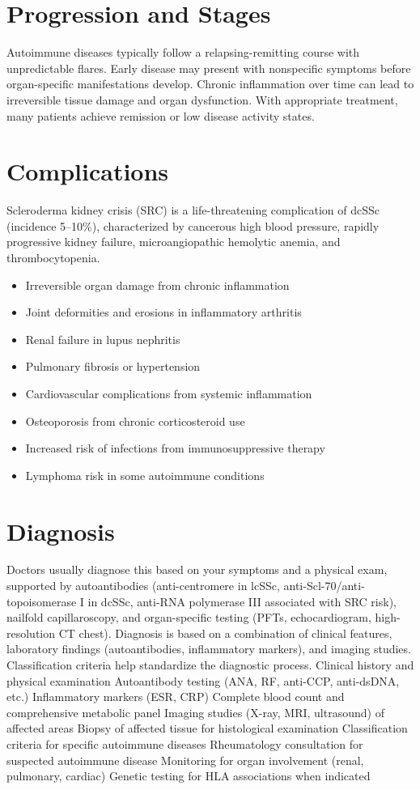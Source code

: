 \section{Progression and Stages}
Autoimmune diseases typically follow a relapsing-remitting course with unpredictable flares. Early disease may present with nonspecific symptoms before organ-specific manifestations develop. Chronic inflammation over time can lead to irreversible tissue damage and organ dysfunction. With appropriate treatment, many patients achieve remission or low disease activity states.
\section{Complications}
Scleroderma kidney crisis (SRC) is a life-threatening complication of dcSSc (incidence 5--10\%), characterized by cancerous high blood pressure, rapidly progressive kidney failure, microangiopathic hemolytic anemia, and thrombocytopenia.

\begin{itemize}[noitemsep]
  \item Irreversible organ damage from chronic inflammation
  \item Joint deformities and erosions in inflammatory arthritis
  \item Renal failure in lupus nephritis
  \item Pulmonary fibrosis or hypertension
  \item Cardiovascular complications from systemic inflammation
  \item Osteoporosis from chronic corticosteroid use
  \item Increased risk of infections from immunosuppressive therapy
  \item Lymphoma risk in some autoimmune conditions
\end{itemize}
\section{Diagnosis}
Doctors usually diagnose this based on your symptoms and a physical exam, supported by autoantibodies (anti-centromere in lcSSc, anti-Scl-70/anti-topoisomerase I in dcSSc, anti-RNA polymerase III associated with SRC risk), nailfold capillaroscopy, and organ-specific testing (PFTs, echocardiogram, high-resolution CT chest). Diagnosis is based on a combination of clinical features, laboratory findings (autoantibodies, inflammatory markers), and imaging studies. Classification criteria help standardize the diagnostic process. Clinical history and physical examination Autoantibody testing (ANA, RF, anti-CCP, anti-dsDNA, etc.) Inflammatory markers (ESR, CRP) Complete blood count and comprehensive metabolic panel Imaging studies (X-ray, MRI, ultrasound) of affected areas Biopsy of affected tissue for histological examination Classification criteria for specific autoimmune diseases Rheumatology consultation for suspected autoimmune disease Monitoring for organ involvement (renal, pulmonary, cardiac) Genetic testing for HLA associations when indicated

